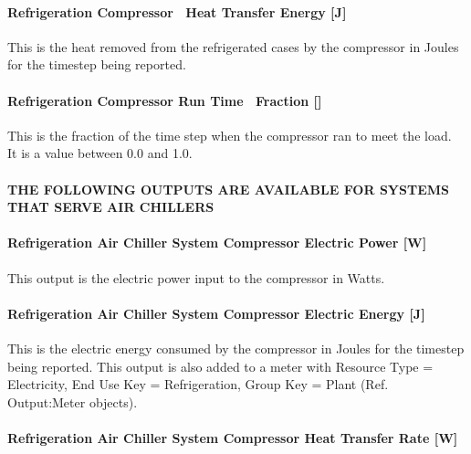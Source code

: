 \paragraph{Refrigeration Compressor~ Heat Transfer Energy {[}J{]}}\label{refrigeration-compressor-heat-transfer-energy-j}

This is the heat removed from the refrigerated cases by the compressor in Joules for the timestep being reported.

\paragraph{Refrigeration Compressor Run Time~ Fraction {[]}}\label{refrigeration-compressor-run-time-fraction}

This is the fraction of the time step when the compressor ran to meet the load.~ It is a value between 0.0 and 1.0.

\paragraph{THE FOLLOWING OUTPUTS ARE AVAILABLE FOR SYSTEMS THAT SERVE AIR CHILLERS}\label{the-following-outputs-are-available-for-systems-that-serve-air-chillers-1}

\paragraph{Refrigeration Air Chiller System Compressor Electric Power {[}W{]}}\label{refrigeration-air-chiller-system-compressor-electric-power-w}

This output is the electric power input to the compressor in Watts.

\paragraph{Refrigeration Air Chiller System Compressor Electric Energy {[}J{]}}\label{refrigeration-air-chiller-system-compressor-electric-energy-j}

This is the electric energy consumed by the compressor in Joules for the timestep being reported. This output is also added to a meter with Resource Type = Electricity, End Use Key = Refrigeration, Group Key = Plant (Ref. Output:Meter objects).

\paragraph{Refrigeration Air Chiller System Compressor Heat Transfer Rate {[}W{]}}\label{refrigeration-air-chiller-system-compressor-heat-transfer-rate-w}

